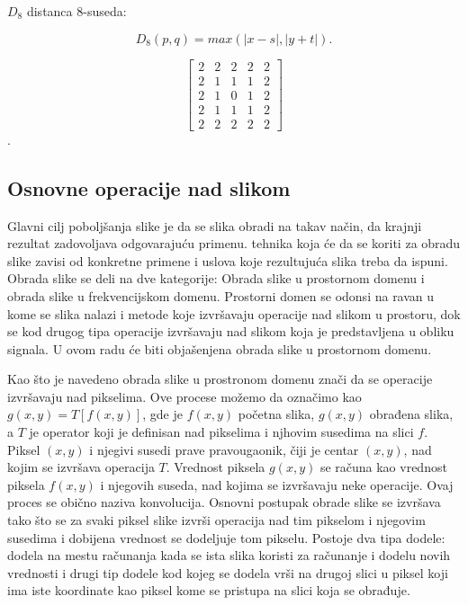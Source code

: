 \documentclass[a4paper,12pt,titlepage]{article}
\begin{document}
$D_{8}$ distanca 8-suseda:

\begin{equation}\label{eq:8ne}
D_{8}(p, q) = max(|x - s|, |y + t|).
\end{equation} 

\[
\begin{bmatrix}
     2 & 2 & 2 & 2  & 2 \\
     2 & 1 & 1 & 1  & 2 \\
     2 & 1 & 0 & 1 & 2 \\
     2 & 1 & 1 & 1  & 2 \\
     2 & 2 & 2 & 2  & 2 
\end{bmatrix}
\].

\subsection{Osnovne operacije nad slikom}%

Glavni cilj poboljšanja slike je da se slika obradi na takav način, da krajnji rezultat zadovoljava odgovarajuću primenu. tehnika koja će da se koriti za obradu slike zavisi od konkretne primene i uslova koje rezultujuća slika treba da ispuni. Obrada slike se deli na dve kategorije: Obrada slike u prostornom domenu i obrada slike u frekvencijskom domenu. Prostorni domen se odonsi na ravan u kome se slika nalazi i metode koje izvršavaju operacije nad slikom u prostoru, dok se kod drugog tipa operacije izvršavaju nad slikom koja je predstavljena u obliku signala. U ovom radu će biti objašenjena obrada slike u prostornom domenu.

Kao što je navedeno obrada slike u prostronom domenu znači da se operacije izvršavaju nad pikselima. Ove procese možemo da označimo kao $g(x, y) = T[f(x, y)]$, gde je $f(x, y)$ početna slika, $g(x, y)$ obrađena slika, a $T$ je operator koji je definisan nad pikselima i njhovim susedima na slici $f$. Piksel $(x, y)$ i njegivi susedi prave pravougaonik, čiji je centar $(x, y)$, nad kojim se izvršava operacija $T$. Vrednost piksela $g(x, y)$ se računa kao vrednost piksela $f(x, y)$ i njegovih suseda, nad kojima se izvršavaju neke operacije. Ovaj proces se obično naziva konvolucija. Osnovni postupak obrade slike se izvršava tako što se za svaki piksel slike izvrši operacija nad tim pikselom i njegovim susedima i dobijena vrednost se dodeljuje tom pikselu. Postoje dva tipa dodele: dodela na mestu računanja kada se ista slika koristi za računanje i dodelu novih vrednosti i drugi tip dodele kod kojeg se dodela vrši na drugoj slici u piksel koji ima iste koordinate kao piksel kome se pristupa na slici koja se obrađuje.   
\end{document}
